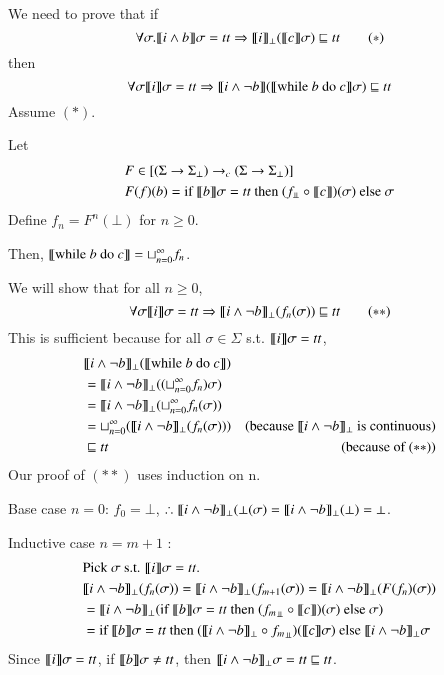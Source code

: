 \documentclass{report}[12pt]
\begin{document}
We need to prove that if
\[\forall \sigma. \llbracket i \wedge b \rrbracket\sigma = tt \Rightarrow \llbracket i \rrbracket_\bot (\llbracket c \rrbracket\sigma) \sqsubseteq tt \tag{$\ast$}\]
then
\[\forall \sigma \llbracket i \rrbracket\sigma = tt \Rightarrow \llbracket i\wedge \neg b \rrbracket (\llbracket \text{while }b\text{ do }c \rrbracket\sigma) \sqsubseteq tt\]
Assume $(\ast)$.

Let
\begin{align*}
    &F \in [(\Sigma \rightarrow \Sigma_\bot) \rightarrow_c (\Sigma \rightarrow \Sigma_\bot)] \\
    &F(f)(b) = \text{if }\interp{b}\sigma = tt \text{ then }(f_\bbot \circ \interp{c})(\sigma) \text{ else }\sigma
\end{align*}
Define $f_n = F^n(\bot)$ for $n \ge 0$.

Then, $\llbracket \text{while }b\text{ do }c \rrbracket = \sqcup_{n=0}^\infty f_n$.

We will show that for all $n \ge 0$,
\[\forall \sigma \llbracket i \rrbracket\sigma = tt \Rightarrow \llbracket i \wedge \neg b \rrbracket_\bot (f_n (\sigma))\sqsubseteq tt \tag{$\ast \ast$}\]
This is sufficient because for all $\sigma \in \Sigma$ s.t. $\llbracket i \rrbracket\sigma = tt$,
\begin{align*}
    &\llbracket i \wedge \neg b \rrbracket_\bot (\llbracket \text{while }b\text{ do }c \rrbracket) \\
    &= \llbracket i \wedge \neg b \rrbracket_\bot ((\sqcup_{n=0}^\infty f_n)\sigma) \\
    &= \llbracket i \wedge \neg b \rrbracket_\bot (\sqcup_{n=0}^\infty f_n(\sigma)) \\
    &= \sqcup_{n=0}^\infty (\llbracket i \wedge \neg b \rrbracket_\bot (f_n(\sigma))) & (\text{because }\llbracket i \wedge \neg b \rrbracket_\bot \text{ is continuous}) \\
    &\sqsubseteq tt & (\text{because of }(\ast \ast))
\end{align*}
Our proof of $(\ast \ast)$ uses induction on n.

Base case $n = 0$: $f_0 = \bot$, $\therefore \llbracket i \wedge \neg b \rrbracket_\bot (\bot(\sigma) = \llbracket i \wedge \neg b \rrbracket_\bot(\bot) = \bot$.

Inductive case $n = m + 1$ :
\begin{align*}
    &\text{Pick }\sigma \text{ s.t. } \interp{i}\sigma = tt. \\
    &\interp{i \wedge \neg b}_\bot (f_n(\sigma)) = \interp{i \wedge \neg b}_\bot (f_{m+1} (\sigma)) = \interp{i \wedge \neg b}_\bot (F(f_n)(\sigma)) \\
    &= \interp{i \wedge \neg b}_\bot (\text{if }\interp{b}\sigma = tt \text{ then }({f_m}_\bbot \circ \interp{c})(\sigma) \text{ else }\sigma) \\
    &= \text{if }\interp{b}\sigma = tt \text{ then }(\interp{i \wedge \neg b}_\bot \circ {f_m}_\bbot)(\interp{c}\sigma) \text{ else }\interp{i \wedge \neg b}_\bot\sigma
\end{align*}
Since $\llbracket i \rrbracket\sigma = tt$, if $\llbracket b \rrbracket\sigma \neq tt$, then $\llbracket i \wedge \neg b \rrbracket_\bot\sigma = tt \sqsubseteq tt$.
\end{document}
